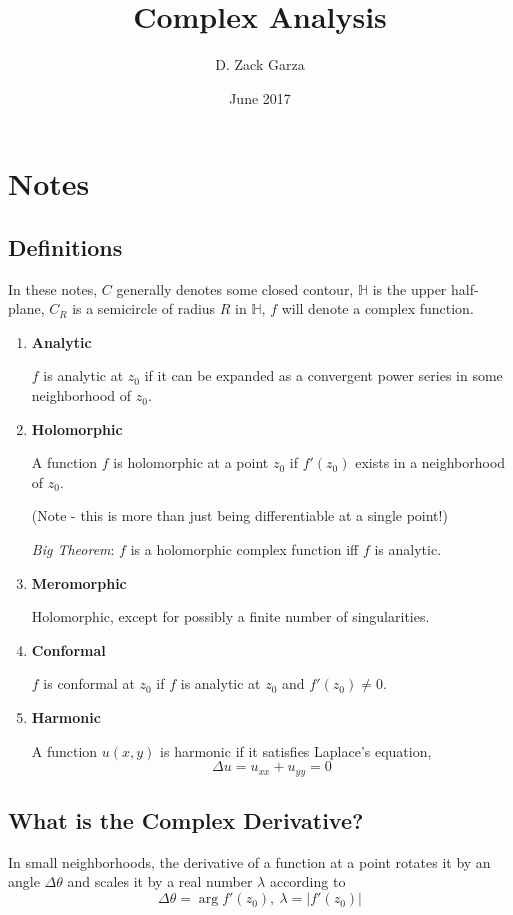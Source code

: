 \documentclass{article}
\title{Complex Analysis}
\author{D. Zack Garza}
\date{June 2017}
\begin{document}
\section{Notes}

\subsection{Definitions}

In these notes, $C$ generally denotes some closed contour, $\mathbb{H}$ is the upper half-plane, $C_R$ is a semicircle of radius $R$ in $\mathbb{H}$, $f$ will denote a complex function.


\begin{enumerate}
   \item \textbf{Analytic}
   
   $f$ is analytic at $z_0$ if it can be expanded as a convergent power series in some neighborhood of $z_0$.
   
   \item \textbf{Holomorphic}
   
   A function $f$ is holomorphic at a point $z_0$ if $f'(z_0)$ exists in a neighborhood of $z_0$.
   
   (Note - this is more than just being differentiable at a single point!)
   
   \textit{Big Theorem}: $f$ is a holomorphic complex function iff $f$ is analytic.
   
   \item \textbf{Meromorphic}
   
   Holomorphic, except for possibly a finite number of singularities.
   
   \item \textbf{Conformal}
   
   $f$ is conformal at $z_0$ if $f$ is analytic at $z_0$ and $f'(z_0) \neq 0$.
   
   \item \textbf{Harmonic}
   
   A function $u(x,y)$ is harmonic if it satisfies Laplace's equation, \[\Delta u = u_{xx} + u_{yy} = 0\]
\end{enumerate}

\subsection{What is the Complex Derivative?}

In small neighborhoods, the derivative of a function at a point rotates it by an angle $\Delta\theta$ and scales it by a real number $\lambda$  according to
\[\Delta\theta = \arg f'(z_0), ~\lambda = |f'(z_0)|\]
\end{document}
